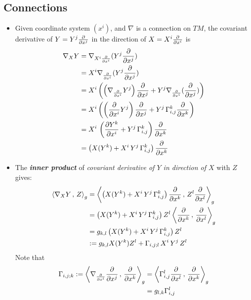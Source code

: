 \documentclass[11pt]{article}
\begin{document}
\subsection{Connections}
\begin{itemize}
\item Given coordinate system $(x^i)$, and $\nabla$ is a connection on $TM$, the covariant derivative of $Y = Y^j\frac{\partial }{ \partial x^j}$ in the direction of $X = X^i \frac{\partial }{ \partial x^i}$ is
\begin{align}
\nabla_{X}{Y} &= \nabla_{X^i \frac{\partial }{ \partial x^i}}{(Y^j\frac{\partial }{ \partial x^j})} \nonumber\\
&= X^i  \nabla_{\frac{\partial }{ \partial x^i}}{(Y^j\frac{\partial }{ \partial x^j})} \nonumber\\
&= X^i  \left(\left(\nabla_{\frac{\partial }{ \partial x^i}}{Y^j}\right)\frac{\partial }{ \partial x^j} + Y^j\nabla_{\frac{\partial }{ \partial x^i}}{(\frac{\partial }{ \partial x^j})} \right) \nonumber\\
&= X^i  \left(\left(\frac{\partial }{ \partial x^i}Y^j\right)\frac{\partial }{ \partial x^j} + Y^j\,\Gamma_{i,j}^{k}\frac{\partial }{ \partial x^k} \right) \nonumber\\
&= X^i\, \left(\frac{\partial Y^k}{ \partial x^i} + Y^j\,\Gamma_{i,j}^{k}\right)\frac{\partial }{ \partial x^k} \label{eqn: affine_connection_1} \\
&= \left(X(Y^k) + X^i\,Y^j\,\Gamma_{i,j}^{k}\right)\frac{\partial }{ \partial x^k} \label{eqn: affine_connection_2}
\end{align}

\item The \emph{\textbf{inner product}} of \textit{covariant derivative of $Y$ in direction of $X$} with $Z$ gives:
\begin{align}
\left\langle \nabla_{X}{Y}\,,\, Z \right\rangle_g &= \left\langle \left(X(Y^k) + X^i\,Y^j\,\Gamma_{i,j}^{k}\right)\frac{\partial }{ \partial x^k}\,,\, Z^l \frac{\partial }{ \partial x^l} \right\rangle_g\nonumber\\
&= \left(X(Y^k) + X^i\,Y^j\,\Gamma_{i,j}^{k}\right)Z^l \left\langle \frac{\partial }{ \partial x^k}\,,\, \frac{\partial }{ \partial x^l} \right\rangle_g       \nonumber\\
&= g_{k,l}\left(X(Y^k) + X^i\,Y^j\,\Gamma_{i,j}^{k}\right)Z^l \label{eqn: affine_connection_riemannian} \\
&:= g_{k,l}X(Y^k)Z^l + \Gamma_{i,j;l}\,X^i\,Y^j\,Z^l  \label{eqn: affine_connection_riemannian2}
\end{align} Note that
\begin{align}
\Gamma_{i,j;k}:= \left\langle \nabla_{\frac{\partial }{ \partial x^i}}{\frac{\partial }{ \partial x^j}}\,,\, \frac{\partial }{ \partial x^k} \right\rangle_g &= \left\langle \Gamma_{i,j}^{l}\frac{\partial }{ \partial x^l}\,,\, \frac{\partial }{ \partial x^k} \right\rangle_g \nonumber\\
&= g_{l,k}\Gamma_{i,j}^{l} \label{eqn: affine_connection_inn_riemannian_christoffel_symbol}
\end{align}


\end{itemize}
\end{document}
